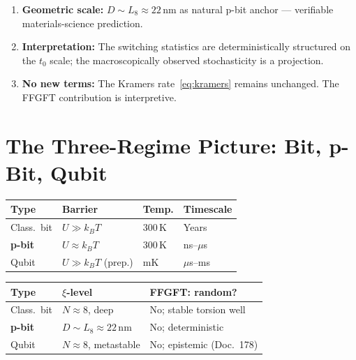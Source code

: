	\begin{keypoint}
		\begin{enumerate}
			\item \textbf{Geometric scale:} $D \sim L_8 \approx 22\,\text{nm}$
			as natural p-bit anchor --- verifiable materials-science
			prediction.
			\item \textbf{Interpretation:} The switching statistics are deterministically
			structured on the $t_0$ scale; the macroscopically observed
			stochasticity is a projection.
			\item \textbf{No new terms:} The Kramers rate~\eqref{eq:kramers}
			remains unchanged. The FFGFT contribution is interpretive.
		\end{enumerate}
	\end{keypoint}
	
	\section{The Three-Regime Picture: Bit, p-Bit, Qubit}
	\label{sec:three-regimes}
	
	{\footnotesize
	\begin{center}
		\begin{tabular}{llll}
			\toprule
			\textbf{Type} & \textbf{Barrier} & \textbf{Temp.} & \textbf{Timescale} \\
			\midrule
			Class.\ bit & $U \gg k_BT$ & 300\,K & Years \\[2pt]
			\textbf{p-bit} & $U \approx k_BT$ & 300\,K & ns--$\mu$s \\[2pt]
			Qubit & $U \gg k_BT$ (prep.) & mK & $\mu$s--ms \\
			\bottomrule
		\end{tabular}
	\end{center}
	\begin{center}
		\begin{tabular}{lll}
			\toprule
			\textbf{Type} & \textbf{$\xi$-level} & \textbf{FFGFT: random?} \\
			\midrule
			Class.\ bit & $N \approx 8$, deep & No; stable torsion well \\[2pt]
			\textbf{p-bit} & $D \sim L_8 \approx 22$\,nm & No; deterministic \\[2pt]
			Qubit & $N \approx 8$, metastable & No; epistemic (Doc.~178) \\
			\bottomrule
		\end{tabular}
	\end{center}
	}
	
